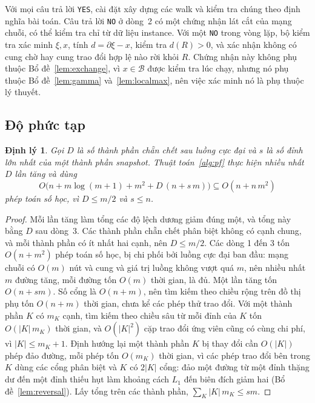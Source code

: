 \documentclass[pdflatex,sn-mathphys-num]{sn-jnl}
\theoremstyle{thmstyleone}
\newtheorem{theorem}{Định lý}
\theoremstyle{thmstyletwo}
\theoremstyle{thmstylethree}
\newcommand{\cB}{\mathcal{B}}
\newcommand{\abs}[1]{\lvert #1\rvert}
\newcommand{\YES}{\texttt{YES}}
\newcommand{\NO}{\texttt{NO}}
\begin{document}
Với mọi câu trả lời \YES{}, cài đặt xây dựng các walk và kiểm tra chúng theo định nghĩa bài toán. Câu trả lời \NO{} ở dòng~2 có một chứng nhận lát cắt của mạng chuỗi, có thể kiểm tra chỉ từ dữ liệu instance. Với một \NO{} trong vòng lặp, bộ kiểm tra xác minh $\xi,x$, tính $d=\partial\xi-x$, kiểm tra $d(R)>0$, và xác nhận không có cung chờ hay cung trao đổi hợp lệ nào rời khỏi $R$. Chứng nhận này không phụ thuộc Bổ đề~\ref{lem:exchange}, vì $x\in\cB$ được kiểm tra lúc chạy, nhưng nó phụ thuộc Bổ đề~\ref{lem:gamma} và~\ref{lem:localmax}, nên việc xác minh nó là phụ thuộc lý thuyết.

\subsection{Độ phức tạp}

\begin{theorem}\label{thm:time}
Gọi $D$ là số thành phần chẵn chết sau luồng cực đại và $s$ là số đỉnh lớn nhất của một thành phần snapshot. Thuật toán~\ref{alg:pf} thực hiện nhiều nhất $D$ lần tăng và dùng
\[
  O\bigl(n+m\log(m+1)+m^2+D\,(n+s\,m)\bigr)\subseteq O(n+n\,m^2)
\]
phép toán số học, vì $D\le m/2$ và $s\le n$.
\end{theorem}

\begin{proof}
Mỗi lần tăng làm tổng các độ lệch dương giảm đúng một, và tổng này bằng $D$ sau dòng~3. Các thành phần chẵn chết phân biệt không có cạnh chung, và mỗi thành phần có ít nhất hai cạnh, nên $D\le m/2$. Các dòng 1 đến 3 tốn $O(n+m^2)$ phép toán số học, bị chi phối bởi luồng cực đại ban đầu: mạng chuỗi có $O(m)$ nút và cung và giá trị luồng không vượt quá $m$, nên nhiều nhất $m$ đường tăng, mỗi đường tốn $O(m)$ thời gian, là đủ. Một lần tăng tốn $O(n+sm)$. Số cổng là $O(n+m)$, nên tìm kiếm theo chiều rộng trên đồ thị phụ tốn $O(n+m)$ thời gian, chưa kể các phép thử trao đổi. Với một thành phần $K$ có $m_K$ cạnh, tìm kiếm theo chiều sâu từ mỗi đỉnh của $K$ tốn $O(\abs{K}\,m_K)$ thời gian, và $O(\abs{K}^2)$ cặp trao đổi ứng viên cũng có cùng chi phí, vì $\abs{K}\le m_K+1$. Định hướng lại một thành phần $K$ bị thay đổi cần $O(\abs{K})$ phép đảo đường, mỗi phép tốn $O(m_K)$ thời gian, vì các phép trao đổi bên trong $K$ dùng các cổng phân biệt và $K$ có $2\abs{K}$ cổng: đảo một đường từ một đỉnh thặng dư đến một đỉnh thiếu hụt làm khoảng cách $L_1$ đến biên đích giảm hai (Bổ đề~\ref{lem:reversal}). Lấy tổng trên các thành phần, $\sum_K\abs{K}\,m_K\le sm$.
\end{proof}
\end{document}
